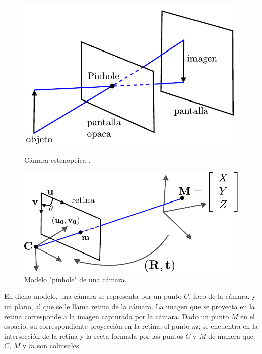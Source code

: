 \begin{figure}[ht!]
\hspace{-0.6cm}
\begin{minipage}[t]{.45\textwidth}
\begin{center}
\includegraphics[scale=0.5]{img/calibracion/pinhole_camara}
\end{center}
\caption{Cámara estenopeica .\cite{faugeras_libro}}
\label{pinhole_camara}
\end{minipage}
\hspace{0.8cm}
\begin{minipage}[t]{.550\textwidth}
\begin{center}
\includegraphics[scale=0.55]{img/calibracion/pinhole_modelo}
\end{center}
\caption{Modelo "pinhole" de una cámara.\cite{zhang_libro}}
\label{pinhole_modelo}
\end{minipage}
\hfill
\end{figure}



En dicho modelo, una cámara se representa por un punto $C$, foco de la cámara, y un plano, al  que se le llama retina de la cámara. La imagen que se proyecta en la retina corresponde a la imagen capturada por la cámara. Dado un punto $M$ en el espacio, su correspondiente proyección en la retina, el punto $m$, se encuentra en la intersección de la retina y la recta formada por los puntos $C$ y $M$ de manera que $C$, $M$ y $m$ son colineales.\\ 




